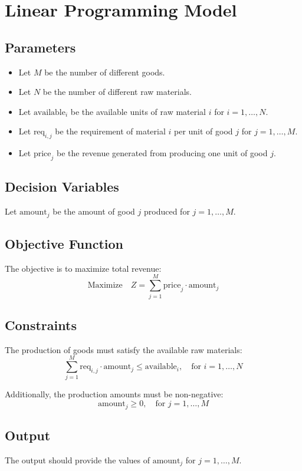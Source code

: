 \documentclass{article}
\begin{document}
\section*{Linear Programming Model}

\subsection*{Parameters}

\begin{itemize}
    \item Let \( M \) be the number of different goods.
    \item Let \( N \) be the number of different raw materials.
    \item Let \( \text{available}_{i} \) be the available units of raw material \( i \) for \( i = 1, \ldots, N \).
    \item Let \( \text{req}_{i,j} \) be the requirement of material \( i \) per unit of good \( j \) for \( j = 1, \ldots, M \).
    \item Let \( \text{price}_{j} \) be the revenue generated from producing one unit of good \( j \).
\end{itemize}

\subsection*{Decision Variables}
Let \( \text{amount}_{j} \) be the amount of good \( j \) produced for \( j = 1, \ldots, M \).

\subsection*{Objective Function}
The objective is to maximize total revenue:
\[
\text{Maximize} \quad Z = \sum_{j=1}^{M} \text{price}_{j} \cdot \text{amount}_{j}
\]

\subsection*{Constraints}
The production of goods must satisfy the available raw materials:
\[
\sum_{j=1}^{M} \text{req}_{i,j} \cdot \text{amount}_{j} \leq \text{available}_{i}, \quad \text{for } i = 1, \ldots, N
\]

Additionally, the production amounts must be non-negative:
\[
\text{amount}_{j} \geq 0, \quad \text{for } j = 1, \ldots, M
\]

\subsection*{Output}
The output should provide the values of \( \text{amount}_{j} \) for \( j = 1, \ldots, M \).
\end{document}
